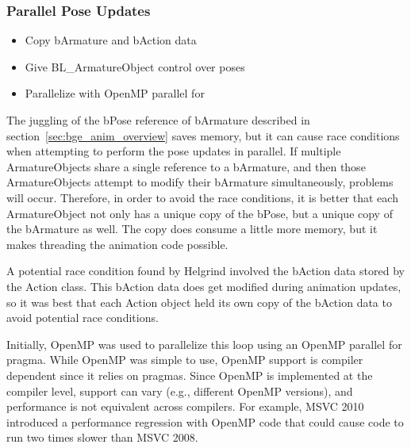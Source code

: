 \subsubsection{Parallel Pose Updates}
\ifsummaries
\begin{itemize}
 \item Copy bArmature and bAction data
 \item Give BL\_ArmatureObject control over poses
 \item Parallelize with OpenMP parallel for
\end{itemize}
\fi

The juggling of the bPose reference of bArmature described in section~\ref{sec:bge_anim_overview} saves memory, but it can cause race conditions when attempting to perform the pose updates in parallel.
If multiple ArmatureObjects share a single reference to a bArmature, and then those ArmatureObjects attempt to modify their bArmature simultaneously, problems will occur.
Therefore, in order to avoid the race conditions, it is better that each ArmatureObject not only has a unique copy of the bPose, but a unique copy of the bArmature as well.
The copy does consume a little more memory, but it makes threading the animation code possible.


A potential race condition found by Helgrind involved the bAction data stored by the Action class.
This bAction data does get modified during animation updates, so it was best that each Action object held its own copy of the bAction data to avoid potential race conditions.

Initially, OpenMP\cite{openmp} was used to parallelize this loop using an OpenMP parallel for pragma.
While OpenMP was simple to use, OpenMP support is compiler dependent since it relies on pragmas.
Since OpenMP is implemented at the compiler level, support can vary (e.g., different OpenMP versions), and performance is not equivalent across compilers.
For example,  MSVC 2010 introduced a performance regression with OpenMP code that could cause code to run two times slower than MSVC 2008.

